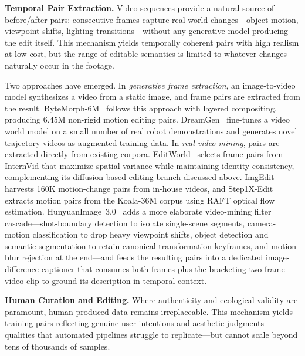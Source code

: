 \documentclass{llmxive}
\begin{document}
\textbf{Temporal Pair Extraction.}
Video sequences provide a natural source of before/after pairs: consecutive frames capture real-world changes---object motion, viewpoint shifts, lighting transitions---without any generative model producing the edit itself. This mechanism yields temporally coherent pairs with high realism at low cost, but the range of editable semantics is limited to whatever changes naturally occur in the footage.

Two approaches have emerged. In \emph{generative frame extraction}, an image-to-video model synthesizes a video from a static image, and frame pairs are extracted from the result. ByteMorph-6M~\citep{chang2025bytemorph} follows this approach with layered compositing, producing 6.45M non-rigid motion editing pairs. DreamGen~\citep{jang2025dreamgen} fine-tunes a video world model on a small number of real robot demonstrations and generates novel trajectory videos as augmented training data. In \emph{real-video mining}, pairs are extracted directly from existing corpora. EditWorld~\citep{zeng2025editworld} selects frame pairs from InternVid that maximize spatial variance while maintaining identity consistency, complementing its diffusion-based editing branch discussed above. ImgEdit~\citep{ye2025imgedit} harvests 160K motion-change pairs from in-house videos, and Step1X-Edit~\citep{liu2025step1x} extracts motion pairs from the Koala-36M corpus using RAFT optical flow estimation. HunyuanImage~3.0~\citep{cao2025hunyuanimage} adds a more elaborate video-mining filter cascade---shot-boundary detection to isolate single-scene segments, camera-motion classification to drop heavy viewpoint shifts, object detection and semantic segmentation to retain canonical transformation keyframes, and motion-blur rejection at the end---and feeds the resulting pairs into a dedicated image-difference captioner that consumes both frames plus the bracketing two-frame video clip to ground its description in temporal context.

\textbf{Human Curation and Editing.}
Where authenticity and ecological validity are paramount, human-produced data remains irreplaceable. This mechanism yields training pairs reflecting genuine user intentions and aesthetic judgments---qualities that automated pipelines struggle to replicate---but cannot scale beyond tens of thousands of samples.
\end{document}
